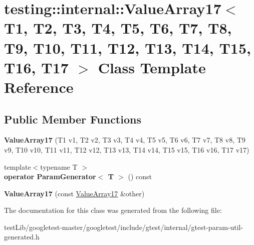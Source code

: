 \hypertarget{classtesting_1_1internal_1_1ValueArray17}{}\section{testing\+:\+:internal\+:\+:Value\+Array17$<$ T1, T2, T3, T4, T5, T6, T7, T8, T9, T10, T11, T12, T13, T14, T15, T16, T17 $>$ Class Template Reference}
\label{classtesting_1_1internal_1_1ValueArray17}
\subsection*{Public Member Functions}
\begin{DoxyCompactItemize}
\item 
\mbox{\label{classtesting_1_1internal_1_1ValueArray17_a943a86a365abde6bdd667e1ad2dbff9b}} 
{\bfseries Value\+Array17} (T1 v1, T2 v2, T3 v3, T4 v4, T5 v5, T6 v6, T7 v7, T8 v8, T9 v9, T10 v10, T11 v11, T12 v12, T13 v13, T14 v14, T15 v15, T16 v16, T17 v17)
\item 
\mbox{\label{classtesting_1_1internal_1_1ValueArray17_a31189716b99483febb83ae7436cd3f6f}} 
{\footnotesize template$<$typename T $>$ }\\{\bfseries operator Param\+Generator$<$ T $>$} () const
\item 
\mbox{\label{classtesting_1_1internal_1_1ValueArray17_a20233ef4958a1b16ec7a8c004f1604fb}} 
{\bfseries Value\+Array17} (const \hyperlink{classtesting_1_1internal_1_1ValueArray17}{Value\+Array17} \&other)
\end{DoxyCompactItemize}


The documentation for this class was generated from the following file\+:\begin{DoxyCompactItemize}
\item 
test\+Lib/googletest-\/master/googletest/include/gtest/internal/gtest-\/param-\/util-\/generated.\+h\end{DoxyCompactItemize}
